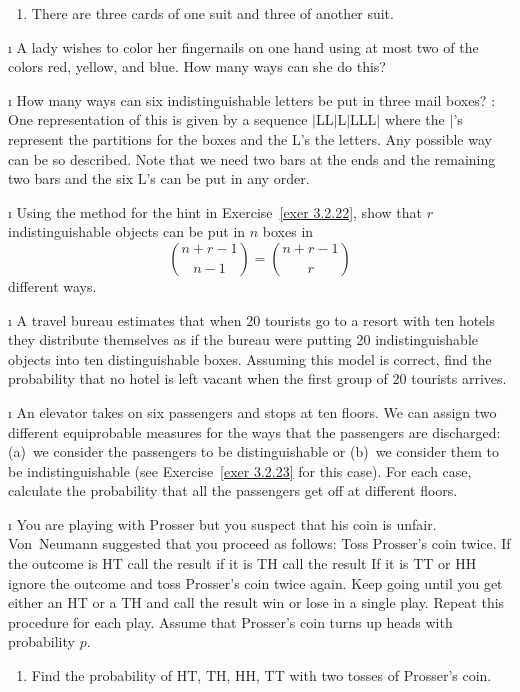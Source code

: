 \begin{LJSItem}
\begin{enumerate}
\item There are three cards of one suit and three of another suit.
\end{enumerate}

\i\label{exer 3.2.21} A lady wishes to color her fingernails on one hand using at
most two of the colors red, yellow, and blue.  How many ways can she do this?

\i\label{exer 3.2.22} How many ways can six indistinguishable letters be 
put in three mail boxes?  : One representation of this is given by a
sequence $|$LL$|$L$|$LLL$|$ where the $|$'s represent the partitions for the boxes and
the L's the letters.  Any possible way can be so described.  Note that we need two
bars at the ends and the remaining two bars and the six L's can be put in any order.

\i\label{exer 3.2.23} Using the method for the hint in Exercise~\ref{exer 3.2.22},
show that $r$ indistinguishable objects can be put in $n$ boxes in 
$$
 {{n + r - 1} \choose {n - 1}} = {{n + r - 1} \choose r}
$$ different ways.

\i\label{exer 3.2.24} A travel bureau estimates that when 20 tourists go to a
resort with ten hotels they distribute themselves as if the bureau were putting 20
indistinguishable objects into ten distinguishable boxes.  Assuming this model is
correct, find the probability that no hotel is left vacant when the first group of 20
tourists arrives.

\i\label{exer 3.2.25} An elevator takes on six passengers and stops at ten floors. 
We can assign two different equiprobable measures for the ways that the passengers are
discharged: (a)~we consider the passengers to be distinguishable or (b)~we consider
them to be indistinguishable (see Exercise~\ref{exer 3.2.23} for this case).   For
each case, calculate the probability that all the passengers get off at different
floors.

\i\label{exer 3.2.26} You are playing  with Prosser but you
suspect that his coin is unfair.  Von~Neumann suggested that you proceed as follows:
Toss Prosser's coin twice.  If the outcome is HT call the result  if it is
TH call the result   If it is TT or HH ignore the outcome and toss
Prosser's coin twice again.  Keep going until you get either an HT or a TH and call
the result win or lose in a single play.  Repeat this procedure for each play.  Assume
that Prosser's coin turns up heads with probability $p$.
\begin{enumerate}
\item Find the probability of HT, TH, HH, TT with two tosses of Prosser's coin.


\end{enumerate}
\end{LJSItem}
